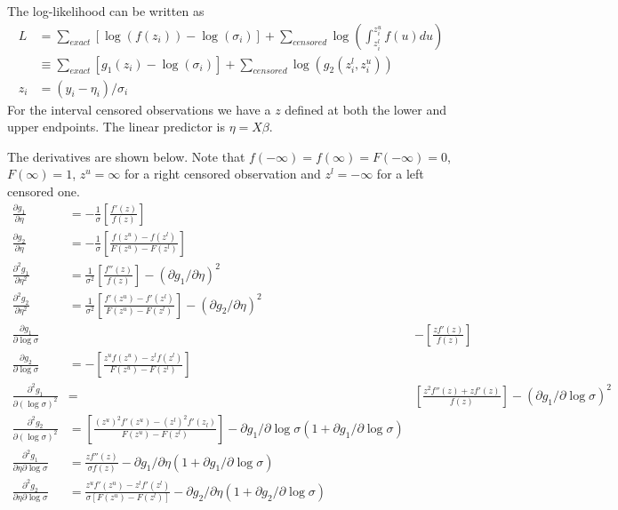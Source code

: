 \documentclass{article}
\begin{document}
The log-likelihood can be written as
\begin{align*}
L &= \sum_{exact}\left[ \log(f(z_i)) -\log(\sigma_i) \right] +
      \sum_{censored} \log \left( \int_{z_i^l}^{z_i^u} f(u)du \right) \\
  &\equiv \sum_{exact}\left[g_1(z_i) -\log(\sigma_i) \right] +
      \sum_{censored} \log(g_2(z_i^l, z_i^u)) \\
 z_i &= (y_i - \eta_i)/ \sigma_i
 \end{align*}
For the interval censored observations we have a $z$ defined at both the
lower and upper endpoints. 
The linear predictor is $\eta = X\beta$.

The derivatives are shown below.
Note that $f(-\infty) = f(\infty) = F(-\infty)=0$,
$F(\infty)=1$, $z^u = \infty$ for a right censored observation
and $z^l = -\infty$ for a left censored one.
\begin{align*}
\frac{\partial g_1}{\partial \eta} &= - \frac{1}{\sigma}
                \left[\frac{f'(z)}{f(z)}  \right]      \\       %
\frac{\partial g_2}{\partial \eta} &= - \frac{1}{\sigma} \left[
                \frac{f(z^u) - f(z^l)}{F(z^u) - F(z^l)}  \right] \\
\frac{\partial^2 g_1}{\partial \eta^2} &=  \frac{1}{\sigma^2}
                \left[ \frac{f''(z)}{f(z)} \right]
                 - (\partial g_1 / \partial \eta)^2                   \\
\frac{\partial^2 g_2}{\partial \eta^2} &=  \frac{1}{\sigma^2} \left[
                \frac{f'(z^u) - f'(z^l)}{F(z^u) - F(z^l)} \right]
                 - (\partial g_2 / \partial \eta)^2                 \\
\frac{\partial g_1}{\partial \log\sigma} && -  \left[
                \frac{zf'(z)}{f(z)}     \right]                          \\
\frac{\partial g_2}{\partial \log\sigma} &= -  \left[
                \frac{z^uf(z^u) - z^lf(z^l)}{F(z^u) - F(z^l)} \right] \\
\frac{\partial^2 g_1}{\partial (\log\sigma)^2} &=&   \left[
                 \frac{z^2 f''(z) + zf'(z)}{f(z)} \right]
                - (\partial g_1 / \partial \log\sigma)^2                   \\
\frac{\partial^2 g_2}{\partial (\log\sigma)^2} &=  \left[
                \frac{(z^u)^2 f'(z^u) - (z^l)^2f'(z_l) }
                {F(z^u) - F(z^l)} \right]
  - \partial g_1 /\partial \log\sigma(1+\partial g_1 / \partial \log\sigma)  \\
\frac{\partial^2 g_1}{\partial \eta \partial \log\sigma} &=
               \frac{zf''(z)}{\sigma f(z)}
       -\partial g_1/\partial \eta (1 + \partial g_1/\partial \log\sigma) \\
\frac{\partial^2 g_2}{\partial \eta \partial \log\sigma} &=
               \frac{z^uf'(z^u) -  z^lf'(z^l)}{\sigma [F(z^u) - F(z^l)]}
       -\partial g_2/\partial \eta (1 + \partial g_2/\partial \log\sigma) \\
\end{align*}
\end{document}
